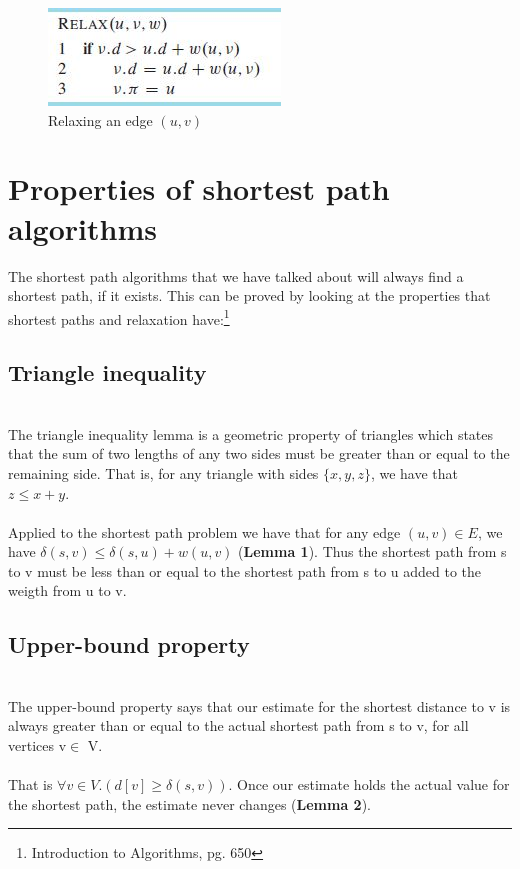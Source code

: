\documentclass[11pt]{article}
\begin{document}
\begin{figure}[H]
\centering
\includegraphics[scale=0.4]{relaxation.png}
\caption{Relaxing an edge $(u,v)$}
\end{figure}


\section{Properties of shortest path algorithms}
The shortest path algorithms that we have talked about will always find a shortest path, if it exists. This can be proved by looking at the properties that shortest paths and relaxation have:\footnote{Introduction to Algorithms, pg. 650}

\subsection{Triangle inequality}\\
The triangle inequality lemma is a geometric property of triangles which states that the sum of two lengths of any two sides must be greater than or equal to the remaining side. That is, for any triangle with sides $\{x,y,z\}$, we have that $z \leq x+y$.\\\\
Applied to the shortest path problem we have that for any edge $(u,v) \in E$, we have $\delta(s,v)\leq \delta(s,u) + w(u,v)$ (\textbf{Lemma 1}). Thus the shortest path from s to v must be less than or equal to the shortest path from s to u added to the weigth from u to v.\\
\subsection{Upper-bound property}\\
The upper-bound property says that our estimate for the shortest distance to v is always greater than or equal to the actual shortest path from s to v, for all vertices v$\in$ V.\\\\
That is $\forall v \in V.(d[v]\geq \delta(s,v))$. Once our estimate holds the actual value for the shortest path, the estimate never changes (\textbf{Lemma 2}).\\
\end{document}
